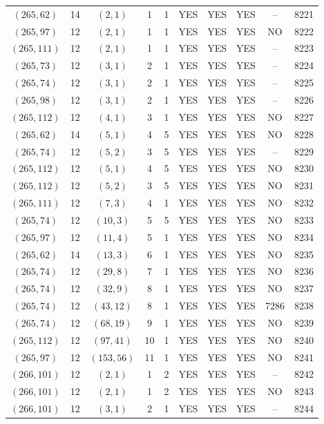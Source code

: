 \begin{longtable}{|c|c|c|c|c|c|c|c|c|c|}
$(265, 62)$ & 14 & $(2, 1)$ & 1 & 1 & YES & YES & YES & -- & 8221\\
$(265, 97)$ & 12 & $(2, 1)$ & 1 & 1 & YES & YES & YES & NO & 8222\\
$(265, 111)$ & 12 & $(2, 1)$ & 1 & 1 & YES & YES & YES & -- & 8223\\
$(265, 73)$ & 12 & $(3, 1)$ & 2 & 1 & YES & YES & YES & -- & 8224\\
$(265, 74)$ & 12 & $(3, 1)$ & 2 & 1 & YES & YES & YES & -- & 8225\\
$(265, 98)$ & 12 & $(3, 1)$ & 2 & 1 & YES & YES & YES & -- & 8226\\
$(265, 112)$ & 12 & $(4, 1)$ & 3 & 1 & YES & YES & YES & NO & 8227\\
$(265, 62)$ & 14 & $(5, 1)$ & 4 & 5 & YES & YES & YES & NO & 8228\\
$(265, 74)$ & 12 & $(5, 2)$ & 3 & 5 & YES & YES & YES & -- & 8229\\
$(265, 112)$ & 12 & $(5, 1)$ & 4 & 5 & YES & YES & YES & NO & 8230\\
$(265, 112)$ & 12 & $(5, 2)$ & 3 & 5 & YES & YES & YES & NO & 8231\\
$(265, 111)$ & 12 & $(7, 3)$ & 4 & 1 & YES & YES & YES & NO & 8232\\
$(265, 74)$ & 12 & $(10, 3)$ & 5 & 5 & YES & YES & YES & NO & 8233\\
$(265, 97)$ & 12 & $(11, 4)$ & 5 & 1 & YES & YES & YES & NO & 8234\\
$(265, 62)$ & 14 & $(13, 3)$ & 6 & 1 & YES & YES & YES & NO & 8235\\
$(265, 74)$ & 12 & $(29, 8)$ & 7 & 1 & YES & YES & YES & NO & 8236\\
$(265, 74)$ & 12 & $(32, 9)$ & 8 & 1 & YES & YES & YES & NO & 8237\\
$(265, 74)$ & 12 & $(43, 12)$ & 8 & 1 & YES & YES & YES & 7286 & 8238\\
$(265, 74)$ & 12 & $(68, 19)$ & 9 & 1 & YES & YES & YES & NO & 8239\\
$(265, 112)$ & 12 & $(97, 41)$ & 10 & 1 & YES & YES & YES & NO & 8240\\
$(265, 97)$ & 12 & $(153, 56)$ & 11 & 1 & YES & YES & YES & NO & 8241\\
$(266, 101)$ & 12 & $(2, 1)$ & 1 & 2 & YES & YES & YES & -- & 8242\\
$(266, 101)$ & 12 & $(2, 1)$ & 1 & 2 & YES & YES & YES & NO & 8243\\
$(266, 101)$ & 12 & $(3, 1)$ & 2 & 1 & YES & YES & YES & -- & 8244\\

\end{longtable}
